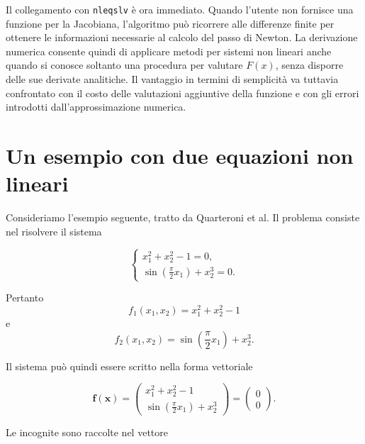 Il collegamento con \texttt{nleqslv} è ora immediato. Quando l'utente non fornisce una funzione per la Jacobiana, l'algoritmo può ricorrere alle differenze finite per ottenere le informazioni necessarie al calcolo del passo di Newton. La derivazione numerica consente quindi di applicare metodi per sistemi non lineari anche quando si conosce soltanto una procedura per valutare $F(x)$, senza disporre delle sue derivate analitiche. Il vantaggio in termini di semplicità va tuttavia confrontato con il costo delle valutazioni aggiuntive della funzione e con gli errori introdotti dall'approssimazione numerica.

\section{Un esempio con due equazioni non lineari}

Consideriamo l'esempio seguente, tratto da Quarteroni
et al. Il problema consiste nel risolvere il sistema

\begin{equation*}
\begin{cases}
x_1^2+x_2^2-1=0,\\[2mm]
\displaystyle
\sin\left(\frac{\pi}{2}x_1\right)+x_2^3=0.
\end{cases}
\label{eq:quarteroni-system}
\end{equation*}

Pertanto
\begin{equation*}
    f_1(x_1,x_2)
    =
    x_1^2+x_2^2-1
\end{equation*}
e
\begin{equation*}
    f_2(x_1,x_2)
    =
    \sin\left(\frac{\pi}{2}x_1\right)+x_2^3.
\end{equation*}

Il sistema può quindi essere scritto nella forma vettoriale

\begin{equation*}
\mathbf{f}(\mathbf{x})
=
\begin{pmatrix}
x_1^2+x_2^2-1\\[2mm]
\displaystyle
\sin\left(\frac{\pi}{2}x_1\right)+x_2^3
\end{pmatrix}
=
\begin{pmatrix}
0\\
0
\end{pmatrix}.
\label{eq:quarteroni-vector}
\end{equation*}

Le incognite sono raccolte nel vettore

